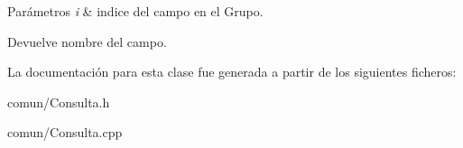 \begin{DoxyParams}{\-Parámetros}
{\em i} & indice del campo en el \-Grupo. \\
\hline
\end{DoxyParams}
\begin{DoxyReturn}{\-Devuelve}
nombre del campo. 
\end{DoxyReturn}


\-La documentación para esta clase fue generada a partir de los siguientes ficheros\-:\begin{DoxyCompactItemize}
\item 
comun/\-Consulta.\-h\item 
comun/\-Consulta.\-cpp\end{DoxyCompactItemize}
